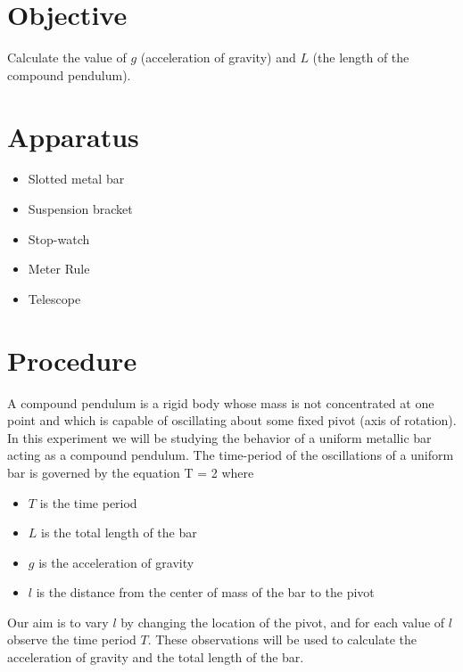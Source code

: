 \documentclass{article}
\begin{document}

   \section*{Objective}
   
      Calculate the value of $g$ (acceleration of gravity) and $L$ (the length of the compound pendulum).


   \section*{Apparatus}

      \begin{itemize}

         \item Slotted metal bar
         \item Suspension bracket
         \item Stop-watch
         \item Meter Rule
         \item Telescope

      \end{itemize}


   \section*{Procedure}

      A compound pendulum is a rigid body whose mass is not concentrated at one point and which is capable of oscillating about some fixed pivot (axis of rotation). In this experiment we will be studying the behavior of a uniform metallic bar acting as a compound pendulum. The time-period of the oscillations of a uniform bar is governed by the equation
      \beq
         T = 2 \pi {}
      \eeq
      where
      \begin{itemize}
         \item $T$ is the time period
         \item $L$ is the total length of the bar
         \item $g$ is the acceleration of gravity
         \item $l$ is the distance from the center of mass of the bar to the pivot
      \end{itemize}

      Our aim is to vary $l$ by changing the location of the pivot, and for each value of $l$ observe the time period $T$. These observations will be used to calculate the acceleration of gravity and the total length of the bar.
\end{document}
